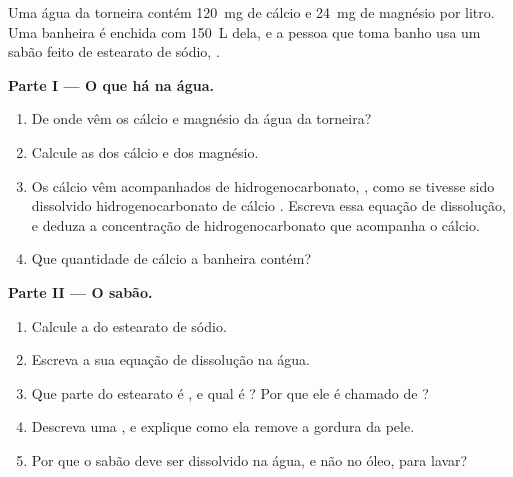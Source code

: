 \begin{problem}
\label{pb:g11:dissolution:1}
Uma água da torneira contém \qty{120}{mg} de  cálcio e \qty{24}{mg}
de  magnésio por litro. Uma banheira é enchida com \qty{150}{L}
dela, e a pessoa que toma banho usa um sabão feito de estearato de
sódio, .

\medskip
\noindent\textbf{Parte I --- O que há na água.}
\begin{enumerate}
  \item De onde vêm os  cálcio e magnésio da água da torneira?
  \item Calcule as  dos  cálcio e dos 
        magnésio.
  \item Os  cálcio vêm acompanhados de  hidrogenocarbonato,
        , como se tivesse sido dissolvido hidrogenocarbonato
        de cálcio . Escreva essa equação de dissolução, e
        deduza a concentração de  hidrogenocarbonato que acompanha o
        cálcio.
  \item Que quantidade de  cálcio a banheira contém?
\end{enumerate}

\medskip
\noindent\textbf{Parte II --- O sabão.}
\begin{enumerate}[resume]
  \item Calcule a  do estearato de sódio.
  \item Escreva a sua equação de dissolução na água.
  \item Que parte do  estearato é , e qual é ?
        Por que ele é chamado de ?
  \item Descreva uma , e explique como ela remove a gordura da
        pele.
  \item Por que o sabão deve ser dissolvido na água, e não no óleo, para
        lavar?
\end{enumerate}


\end{problem}
